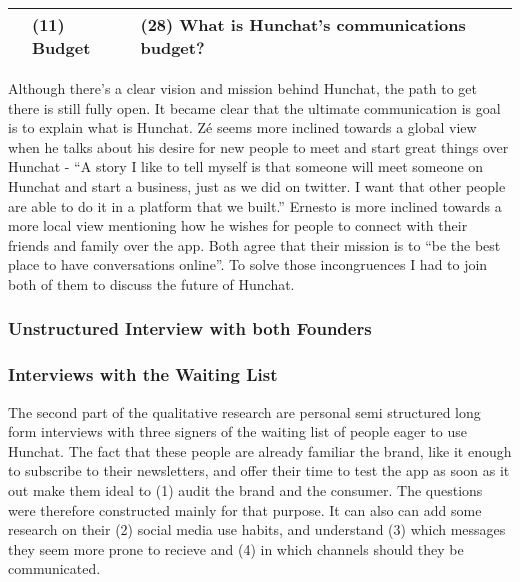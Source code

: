\documentclass[12pt]{article}
\begin{document}
\begin{table}[htb]
\begin{tabular}{ @{}P{0.15\textwidth}P{0.2\textwidth}P{0.6\textwidth}@{} }
                            & (11) Budget            & (28) What is Hunchat's communications budget?                                                                                                                                                                                                                                                                                                                                                                                    \\ 
\hline
\end{tabular}
\end{table}

Although there's a clear vision and mission behind Hunchat, the path to get there is still fully open. It became clear that the ultimate communication is goal is to explain what is Hunchat. Zé seems more inclined towards a global view when he talks about his desire for new people to meet and start great things over Hunchat - “A story I like to tell myself is that someone will meet someone on Hunchat and start a business, just as we did on twitter. I want that other people are able to do it in a platform that we built.” Ernesto is more inclined towards a more local view mentioning how he wishes for people to connect with their friends and family over the app. Both agree that their mission is to “be the best place to have conversations online”. To solve those incongruences I had to join both of them to discuss the future of Hunchat.

\subsubsection{Unstructured Interview with both Founders}


\pagebreak
\subsubsection{Interviews with the Waiting List}
The second part of the qualitative research are personal semi structured long form interviews  with three signers of the waiting list of people eager to use Hunchat. The fact that these people are already familiar the brand, like it enough to subscribe to their newsletters, and offer their time to test the app as soon as it out make them ideal to (1) audit the brand and the consumer. The questions were therefore constructed mainly for that purpose. It can also can add some research on their (2) social media use habits, and understand (3) which messages they seem more prone to recieve and (4) in which channels should they be communicated.
\end{document}
